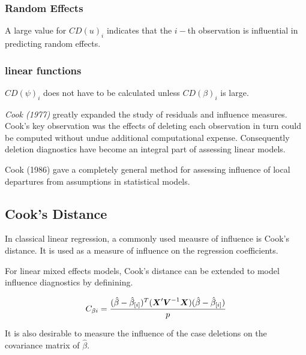 \documentclass[12pt, a4paper]{report}
\theoremstyle{plain}
\theoremstyle{definition}
\theoremstyle{remark}
\begin{document}
\subsubsection{Random Effects}

A large value for $CD(u)_i$ indicates that the $i-$th observation is influential in predicting random effects.

\subsubsection{linear functions}

$CD(\psi)_i$ does not have to be calculated unless $CD(\beta)_i$ is large.


%	
%	
\textit{Cook (1977)} greatly expanded the study of residuals and influence measures. Cook's key observation was the effects of deleting each observation in turn could be computed without undue additional computational expense. Consequently deletion diagnostics have become an integral part of assessing linear models.


Cook (1986) gave a completely general method for assessing influence of local departures from
assumptions in statistical models.


\subsection{Cook's Distance}%
In classical linear regression, a commonly used meausre of influence is Cook's distance. It is used as a measure of influence on the regression coefficients.

For linear mixed effects models, Cook's distance can be extended to model influence diagnostics by definining.

\[ C_{\beta i} = {(\hat{\beta} - \hat{\beta}_{[i]})^{T}(\boldsymbol{X}^{\prime}\boldsymbol{V}^{-1}\boldsymbol{X}) (\hat{\beta} - \hat{\beta}_{[i]}) \over p}\]

It is also desirable to measure the influence of the case deletions on the covariance matrix of $\hat{\beta}$.
\end{document}
